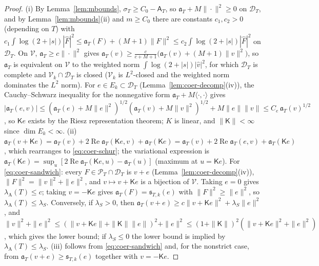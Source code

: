 \documentclass[11pt]{amsart}
\theoremstyle{definition}
\theoremstyle{remark}
\newcommand{\Rel}{\operatorname{Re}}
\newcommand{\PT}{\mathcal P_T}
\newcommand{\lamA}{\lambda_{\mathrm A}(T)}
\newcommand{\Fh}{\widehat F}
\newcommand{\Aconst}{\mathsf A_T}
\begin{document}
\begin{proof}
(i) By Lemma~\ref{lem:mbounds}, $\sigma_T\ge C_0-\Aconst$, so $\mathfrak a_T+M\|\cdot\|^2\ge0$ on $\mathcal D_T$, and
by Lemma~\ref{lem:mbounds}(ii) and $m\ge C_0$ there are constants $c_1,c_2>0$ (depending on $T$) with
$c_1\int\log(2+|s|)|\Fh|^2\le\mathfrak a_T(F)+(M+1)\|F\|^2\le c_2\int\log(2+|s|)|\Fh|^2$ on $\mathcal D_T$. On $\mathcal V$,
$\mathfrak a_T\ge c\|\cdot\|^2$ gives $\mathfrak a_T(v)\ge\frac c{c+M+1}\big(\mathfrak a_T(v)+(M+1)\|v\|^2\big)$, so
$\mathfrak a_T$ is equivalent on $\mathcal V$ to the weighted norm $\int\log(2+|s|)|\widehat v|^2$, for which
$\mathcal D_T$ is complete and $\mathcal V_k\cap\mathcal D_T$ is closed ($\mathcal V_k$ is $L^2$-closed and the weighted norm
dominates the $L^2$ norm). For $e\in E_k\subset\mathcal D_T$ (Lemma~\ref{lem:coer-decomp}(iv)), the Cauchy--Schwarz
inequality for the nonnegative form $\mathfrak a_T+M\langle\cdot,\cdot\rangle$ gives
$|\mathfrak a_T(e,v)|\le(\mathfrak a_T(e)+M\|e\|^2)^{1/2}(\mathfrak a_T(v)+M\|v\|^2)^{1/2}+M\|e\|\|v\|\le C_e\,\mathfrak a_T(v)^{1/2}$,
so $\mathsf Ke$ exists by the Riesz representation theorem; $K$ is linear, and $\|\mathsf K\|<\infty$ since $\dim E_k<\infty$.
(ii) $\mathfrak a_T(v+\mathsf Ke)=\mathfrak a_T(v)+2\Rel\mathfrak a_T(\mathsf Ke,v)+\mathfrak a_T(\mathsf Ke)=\mathfrak a_T(v)+2\Rel\mathfrak a_T(e,v)+\mathfrak a_T(\mathsf Ke)$,
which rearranges to \eqref{eq:coer-schur}; the variational expression is $\mathfrak a_T(\mathsf Ke)=\sup_u[2\Rel\mathfrak a_T(\mathsf Ke,u)-\mathfrak a_T(u)]$
(maximum at $u=\mathsf Ke$). For \eqref{eq:coer-sandwich}: every $F\in\PT\cap\mathcal D_T$ is $v+e$ (Lemma~\ref{lem:coer-decomp}(iv)),
$\|F\|^2=\|v\|^2+\|e\|^2$, and $v\mapsto v+\mathsf Ke$ is a bijection of $\mathcal V$. Taking $e=0$ gives $\lamA\le c$; taking
$v=-\mathsf Ke$ gives $\mathfrak a_T(F)=\mathfrak s_{T,k}(e)$ with $\|F\|^2\ge\|e\|^2$, so $\lamA\le\lambda_S$. Conversely, if
$\lambda_S>0$, then $\mathfrak a_T(v+e)\ge c\|v+\mathsf Ke\|^2+\lambda_S\|e\|^2$, and
$\|v\|^2+\|e\|^2\le(\|v+\mathsf Ke\|+\|\mathsf K\|\|e\|)^2+\|e\|^2\le(1+\|\mathsf K\|)^2(\|v+\mathsf Ke\|^2+\|e\|^2)$, which gives the lower bound; if
$\lambda_S\le0$ the lower bound is implied by $\lamA\le\lambda_S$. (iii) follows from \eqref{eq:coer-sandwich}
and, for the nonstrict case, from $\mathfrak a_T(v+e)\ge\mathfrak s_{T,k}(e)$ together with $v=-\mathsf Ke$.
\end{proof}
\end{document}
